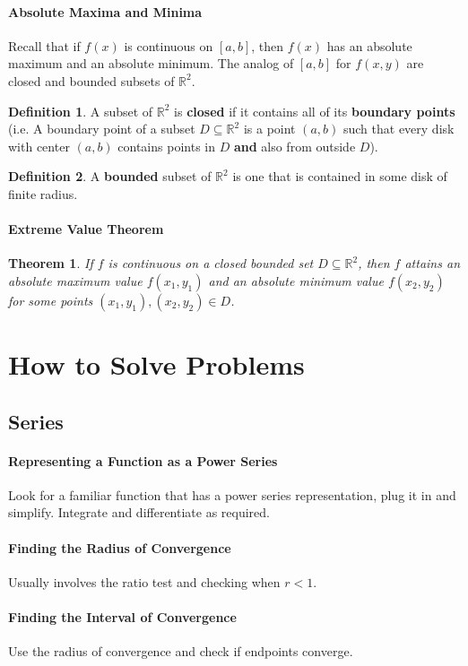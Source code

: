 \documentclass[12 pt]{article}
\newtheorem{thm}{Theorem}
\theoremstyle{definition}
\newtheorem{defn}{Definition}
\begin{document}
\paragraph{Absolute Maxima and Minima} Recall that if $f(x)$ is continuous on $[a,b]$, then $f(x)$ has an absolute maximum and an absolute minimum. The analog of $[a,b]$ for $f(x,y)$ are closed and bounded subsets of $\mathbb{R}^2$.
\begin{defn}
  A subset of $\mathbb{R}^2$ is \textbf{closed} if it contains all of its \textbf{boundary points} (i.e. A boundary point of a subset $D\subseteq \mathbb{R}^2$ is a point $(a,b)$ such that every disk with center $(a,b)$ contains points in $D$ \textbf{and} also from outside $D$).
\end{defn}
\begin{defn}
  A \textbf{bounded} subset of $\mathbb{R}^2$ is one that is contained in some disk of finite radius.
\end{defn}
\paragraph{Extreme Value Theorem}
\begin{thm}
  If $f$ is continuous on a closed bounded set $D\subseteq \mathbb{R}^2$, then $f$ attains an absolute maximum value $f(x_1,y_1)$ and an absolute minimum value $f(x_2,y_2)$ for some points $(x_1,y_1),(x_2,y_2)\in D$.
\end{thm}
\section{How to Solve Problems}
\subsection{Series}
\paragraph{Representing a Function as a Power Series} Look for a familiar function that has a power series representation, plug it in and simplify. Integrate and differentiate as required.
\paragraph{Finding the Radius of Convergence} Usually involves the ratio test and checking when $r<1$.
\paragraph{Finding the Interval of Convergence} Use the radius of convergence and check if endpoints converge.
\end{document}
